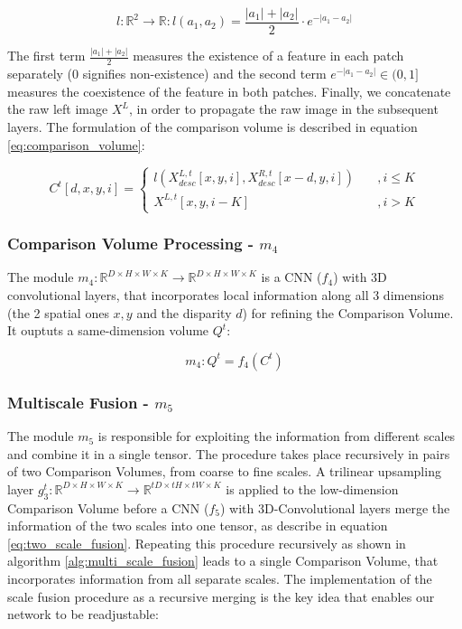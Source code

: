 \documentclass[runningheads]{llncs}
\begin{document}
\begin{equation} \label{eq:m}
    l: \mathbb{R}^2 \rightarrow \mathbb{R}: l(a_1, a_2) = \frac{|a_1| + |a_2|}{2} \cdot e^{-|a_1 - a_2|}    
\end{equation}

 The first term $\frac{|a_1| + |a_2|}{2}$ measures the existence of a feature in each patch separately ($0$ signifies non-existence) and the second term $e^{-|a_1 - a_2|} \in (0,1]$ measures the coexistence of the feature in both patches. Finally, we concatenate the raw left image $X^L$, in order to propagate the raw image in the subsequent layers. The formulation of the comparison volume is described in equation \ref{eq:comparison_volume}:

\begin{equation}\label{eq:comparison_volume}
C^t[d, x, y, i] = 
    \begin{cases}
        l( X^{L, t}_{desc}[x,y,i], X^{R, t}_{desc}[x-d,y, i]) &\quad ,i \leq K \\
        X^{L,t}[x,y,i-K] &\quad ,i > K
     \end{cases}
\end{equation}{}  


\subsubsection{Comparison Volume Processing - $m_4$} The module $m_4: \mathbb{R}^{D \times H \times W \times K} \rightarrow \mathbb{R}^{D \times H \times W \times K}$ is a CNN ($f_4$) with 3D convolutional layers, that incorporates local information along all 3 dimensions (the 2 spatial ones $x,y$ and the disparity $d$) for refining the Comparison Volume. It ouptuts a same-dimension volume $Q^t$:

\begin{equation}
    m_4: Q^t = f_4(C^t)
\end{equation}


\subsubsection{Multiscale Fusion - $m_5$}

The module $m_5$ is responsible for exploiting the information from different scales and combine it in a single tensor. The procedure takes place recursively in pairs of two Comparison Volumes, from coarse to fine scales. A trilinear upsampling layer $g_3^t: \mathbb{R}^{D \times H \times W \times K} \rightarrow \mathbb{R}^{tD \times tH \times tW \times K}$ is applied to the low-dimension Comparison Volume before a CNN ($f_5$) with 3D-Convolutional layers merge the information of the two scales into one tensor, as describe in equation \ref{eq:two_scale_fusion}. Repeating this procedure recursively as shown in algorithm \ref{alg:multi_scale_fusion} leads to a single Comparison Volume, that incorporates information from all separate scales. The implementation of the scale fusion procedure as a recursive merging is the key idea that enables our network to be readjustable:
\end{document}
